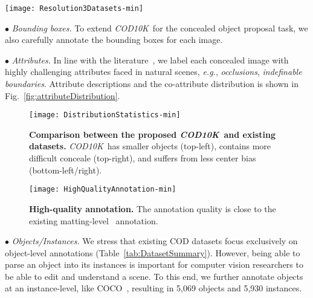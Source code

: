 \documentclass[10pt,journal,compsoc]{IEEEtran}
\def\eg{\emph{e.g.}}
\newcommand{\figref}[1]{Fig.~\ref{#1}}
\newcommand{\tabref}[1]{Table~\ref{#1}}
\newcommand{\Rev}[1]{\textcolor{black}{#1}}
\def\ourdataset{\textit{COD10K}}
\begin{document}
\begin{figure*}[t!]
  \centering
  \texttt{[image: Resolution3Datasets-min]}\\
  \vspace{-12pt}
  \caption{\textbf{Image resolution \Rev{(unit for the axis: pixel)} distribution of COD datasets.}
    From left to right: 
    CHAMELEON~\cite{2018Animal},
    CAMO-COCO~\cite{le2019anabranch} and \ourdataset~datasets.
  }\label{fig:Resolution3Datasets}
\end{figure*}



$\bullet$ \emph{Bounding boxes.}
To extend \ourdataset~for the concealed object proposal task,
we also carefully annotate the bounding boxes for each image.

$\bullet$ \emph{Attributes.}
In line with the literature~\cite{Fan2021SOC,perazzi2016benchmark}, 
we label each concealed image %
with highly challenging attributes faced in natural scenes,
\eg, \emph{occlusions}, \emph{indefinable boundaries}.
Attribute descriptions %
and the co-attribute distribution is shown in 
\figref{fig:attributeDistribution}.

\begin{figure}[t!]
  \centering
  \texttt{[image: DistributionStatistics-min]}\\
  \vspace{-10pt}
  \caption{\textbf{Comparison between the proposed \ourdataset~and 
    existing datasets.}
    \ourdataset~has smaller objects (top-left),
    contains more difficult conceale (top-right),
    and suffers from less center bias (bottom-left/right).
  }\label{fig:DistributionStatistics}
\end{figure}

\begin{figure}[t!]
  \centering
  \texttt{[image: HighQualityAnnotation-min]}\\
  \vspace{-10pt}
  \caption{\textbf{High-quality annotation.}
	The annotation quality is close to the existing matting-level~\cite{zhang2019late} annotation.
  }\label{fig:highqualityAnnotation}
\end{figure}

$\bullet$ \emph{Objects/Instances.}
We stress that existing COD datasets focus exclusively on
object-level annotations (\tabref{tab:DatasetSummary}).
However, being able to parse an object into its instances is
important for computer vision researchers to be able to edit
and understand a scene.
%
To this end, we further annotate objects at an instance-level,
like COCO~\cite{lin2014microsoft}, 
resulting in 5,069 objects and 5,930 instances.
\end{document}
